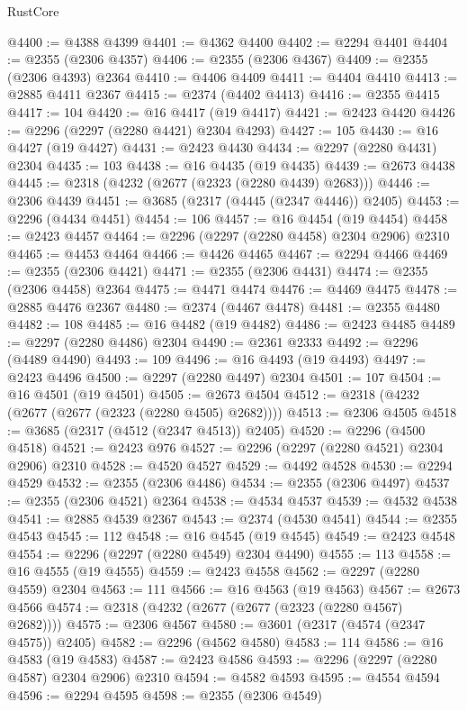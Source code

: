 \begin{lexlean}{RustCore}
\begin{coremodule}
@4400 := @4388 @4399
@4401 := @4362 @4400
@4402 := @2294 @4401
@4404 := @2355 (@2306 @4357)
@4406 := @2355 (@2306 @4367)
@4409 := @2355 (@2306 @4393) @2364
@4410 := @4406 @4409
@4411 := @4404 @4410
@4413 := @2885 @4411 @2367
@4415 := @2374 (@4402 @4413)
@4416 := @2355 @4415
@4417 := 104
@4420 := @16 @4417 (@19 @4417)
@4421 := @2423 @4420
@4426 := @2296 (@2297 (@2280 @4421) @2304 @4293)
@4427 := 105
@4430 := @16 @4427 (@19 @4427)
@4431 := @2423 @4430
@4434 := @2297 (@2280 @4431) @2304
@4435 := 103
@4438 := @16 @4435 (@19 @4435)
@4439 := @2673 @4438
@4445 := @2318 (@4232 (@2677 (@2323 (@2280 @4439) @2683)))
@4446 := @2306 @4439
@4451 := @3685 (@2317 (@4445 (@2347 @4446)) @2405)
@4453 := @2296 (@4434 @4451)
@4454 := 106
@4457 := @16 @4454 (@19 @4454)
@4458 := @2423 @4457
@4464 := @2296 (@2297 (@2280 @4458) @2304 @2906) @2310
@4465 := @4453 @4464
@4466 := @4426 @4465
@4467 := @2294 @4466
@4469 := @2355 (@2306 @4421)
@4471 := @2355 (@2306 @4431)
@4474 := @2355 (@2306 @4458) @2364
@4475 := @4471 @4474
@4476 := @4469 @4475
@4478 := @2885 @4476 @2367
@4480 := @2374 (@4467 @4478)
@4481 := @2355 @4480
@4482 := 108
@4485 := @16 @4482 (@19 @4482)
@4486 := @2423 @4485
@4489 := @2297 (@2280 @4486) @2304
@4490 := @2361 @2333
@4492 := @2296 (@4489 @4490)
@4493 := 109
@4496 := @16 @4493 (@19 @4493)
@4497 := @2423 @4496
@4500 := @2297 (@2280 @4497) @2304
@4501 := 107
@4504 := @16 @4501 (@19 @4501)
@4505 := @2673 @4504
@4512 := @2318 (@4232 (@2677 (@2677 (@2323 (@2280 @4505) @2682))))
@4513 := @2306 @4505
@4518 := @3685 (@2317 (@4512 (@2347 @4513)) @2405)
@4520 := @2296 (@4500 @4518)
@4521 := @2423 @976
@4527 := @2296 (@2297 (@2280 @4521) @2304 @2906) @2310
@4528 := @4520 @4527
@4529 := @4492 @4528
@4530 := @2294 @4529
@4532 := @2355 (@2306 @4486)
@4534 := @2355 (@2306 @4497)
@4537 := @2355 (@2306 @4521) @2364
@4538 := @4534 @4537
@4539 := @4532 @4538
@4541 := @2885 @4539 @2367
@4543 := @2374 (@4530 @4541)
@4544 := @2355 @4543
@4545 := 112
@4548 := @16 @4545 (@19 @4545)
@4549 := @2423 @4548
@4554 := @2296 (@2297 (@2280 @4549) @2304 @4490)
@4555 := 113
@4558 := @16 @4555 (@19 @4555)
@4559 := @2423 @4558
@4562 := @2297 (@2280 @4559) @2304
@4563 := 111
@4566 := @16 @4563 (@19 @4563)
@4567 := @2673 @4566
@4574 := @2318 (@4232 (@2677 (@2677 (@2323 (@2280 @4567) @2682))))
@4575 := @2306 @4567
@4580 := @3601 (@2317 (@4574 (@2347 @4575)) @2405)
@4582 := @2296 (@4562 @4580)
@4583 := 114
@4586 := @16 @4583 (@19 @4583)
@4587 := @2423 @4586
@4593 := @2296 (@2297 (@2280 @4587) @2304 @2906) @2310
@4594 := @4582 @4593
@4595 := @4554 @4594
@4596 := @2294 @4595
@4598 := @2355 (@2306 @4549)

\end{coremodule}
\end{lexlean}
